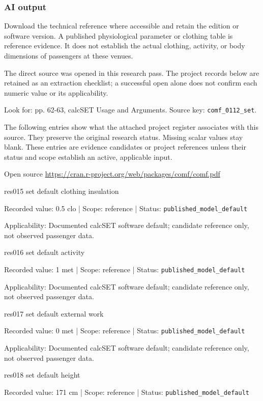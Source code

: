 \subsubsection*{AI output}
Download the technical reference where accessible and retain the edition or software version. A published physiological parameter or clothing table is reference evidence. It does not establish the actual clothing, activity, or body dimensions of passengers at these venues.

The direct source was opened in this research pass. The project records below are retained as an extraction checklist; a successful open alone does not confirm each numeric value or its applicability.

Look for: pp. 62-63, calcSET Usage and Arguments. Source key: \nolinkurl{comf_0112_set}.

The following entries show what the attached project register associates with this source. They preserve the original research status. Missing scalar values stay blank. These entries are evidence candidates or project references unless their status and scope establish an active, applicable input.

Open source  \url{https://cran.r-project.org/web/packages/comf/comf.pdf}

res015  set default clothing insulation

Recorded value: 0.5 clo | Scope: reference | Status: \nolinkurl{published_model_default}

Applicability: Documented calcSET software default; candidate reference only, not observed passenger data.

res016  set default activity

Recorded value: 1 met | Scope: reference | Status: \nolinkurl{published_model_default}

Applicability: Documented calcSET software default; candidate reference only, not observed passenger data.

res017  set default external work

Recorded value: 0 met | Scope: reference | Status: \nolinkurl{published_model_default}

Applicability: Documented calcSET software default; candidate reference only, not observed passenger data.

res018  set default height

Recorded value: 171 cm | Scope: reference | Status: \nolinkurl{published_model_default}

